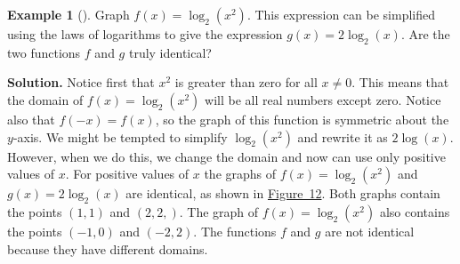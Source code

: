 \documentclass[10pt,]{book}
\theoremstyle{plain}
\theoremstyle{definition}
\theoremstyle{definition}
\newtheorem{example}[theorem]{Example}
\theoremstyle{definition}
\numberwithin{equation}{section}
\newlength{\panelmax}
\begin{document}
\begin{example}[]\label{example-27}
\hypertarget{p-351}{}%
Graph \(f(x) = \log_2 \left( x^2 \right)\). This expression can be simplified using the laws of logarithms to give the expression \(g(x) = 2 \log_2 \left( x \right)\). Are the two functions \(f\) and \(g\) truly identical?%
\par\smallskip%
\noindent\textbf{Solution.}\hypertarget{solution-27}{}\quad%
\hypertarget{p-352}{}%
Notice first that \(x^2\) is greater than zero for all \(x \neq 0\).  This means that the domain of \(f(x) = \log_2 \left( x^2 \right)\) will be all real numbers except zero.  Notice also that \(f(-x) = f(x)\), so the graph of this function is symmetric about the \(y\)-axis.  We might be tempted to simplify \(\log_2 \left( x^2 \right)\) and rewrite it as \(2 \log \left( x \right)\). However, when we do this, we change the domain and now can use only positive values of \(x\).  For positive values of \(x\) the graphs of \(f(x) = \log_2 \left( x^2 \right)\) and \(g(x) = 2 \log_2 \left( x \right)\) are identical, as shown in \hyperref[logs-not-equal]{Figure~12}. Both graphs contain the points \(\left( 1,1 \right)\) and \(\left( 2, 2, \right)\). The graph of \(f(x) = \log_2 \left( x^2 \right)\) also contains the points \(\left( -1, 0 \right)\) and \(\left( -2, 2 \right)\).  The functions \(f\) and \(g\) are not identical because they have different domains.%
\begin{figure}
\centering
{%
\setlength{\panelmax}{0pt}
\ifdefined\panelboxAimage\else\newsavebox{\panelboxAimage}\fi%
\begin{lrbox}{\panelboxAimage}
\end{lrbox}}
\end{figure}
\end{example}
\end{document}
